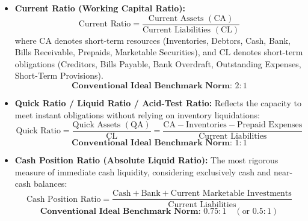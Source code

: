 \begin{formulabox}
\begin{itemize}[leftmargin=*, noitemsep]
    \item \textbf{Current Ratio (Working Capital Ratio):}
    \begin{equation}
        \text{Current Ratio} = \frac{\text{Current Assets } (\text{CA})}{\text{Current Liabilities } (\text{CL})}
    \end{equation}
    where $\text{CA}$ denotes short-term resources (Inventories, Debtors, Cash, Bank, Bills Receivable, Prepaids, Marketable Securities), and $\text{CL}$ denotes short-term obligations (Creditors, Bills Payable, Bank Overdraft, Outstanding Expenses, Short-Term Provisions).
    \begin{equation*}
        \textbf{Conventional Ideal Benchmark Norm: } 2 : 1
    \end{equation*}

    \item \textbf{Quick Ratio / Liquid Ratio / Acid-Test Ratio:}
    Reflects the capacity to meet instant obligations without relying on inventory liquidations:
    \begin{equation}
        \text{Quick Ratio} = \frac{\text{Quick Assets } (\text{QA})}{\text{CL}} = \frac{\text{CA} - \text{Inventories} - \text{Prepaid Expenses}}{\text{Current Liabilities}}
    \end{equation}
    \begin{equation*}
        \textbf{Conventional Ideal Benchmark Norm: } 1 : 1
    \end{equation*}

    \item \textbf{Cash Position Ratio (Absolute Liquid Ratio):}
    The most rigorous measure of immediate cash liquidity, considering exclusively cash and near-cash balances:
    \begin{equation}
        \text{Cash Position Ratio} = \frac{\text{Cash} + \text{Bank} + \text{Current Marketable Investments}}{\text{Current Liabilities}}
    \end{equation}
    \begin{equation*}
        \textbf{Conventional Ideal Benchmark Norm: } 0.75 : 1 \quad (\text{or } 0.5 : 1)
    \end{equation*}
\end{itemize}
\end{formulabox}

